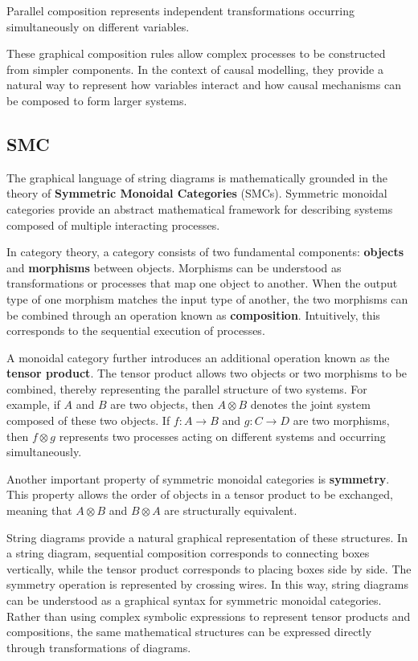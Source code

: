 \documentclass[a4paper]{report}
\begin{document}
Parallel composition represents independent transformations occurring simultaneously on different variables.

These graphical composition rules allow complex processes to be constructed from simpler components. In the context of causal modelling, they provide a natural way to represent how variables interact and how causal mechanisms can be composed to form larger systems.

\subsection{SMC}

The graphical language of string diagrams is mathematically grounded in the theory of \textbf{Symmetric Monoidal Categories} (SMCs)\cite{Selinger2011}. Symmetric monoidal categories provide an abstract mathematical framework for describing systems composed of multiple interacting processes.

In category theory, a category consists of two fundamental components: \textbf{objects} and \textbf{morphisms} between objects\cite{basic-cat-theory}. Morphisms can be understood as transformations or processes that map one object to another. When the output type of one morphism matches the input type of another, the two morphisms can be combined through an operation known as \textbf{composition}. 
Intuitively, this corresponds to the sequential execution of processes.

A monoidal category further introduces an additional operation known as the \textbf{tensor product}. The tensor product allows two objects or two morphisms to be combined, thereby representing the parallel structure of two systems. For example, if $A$ and $B$ are two objects, then $A \otimes B$ denotes the joint system composed of these two objects. If $f : A \rightarrow B$ and $g : C \rightarrow D$ are two morphisms, then $f \otimes g$ represents two processes acting on different systems and occurring simultaneously.

Another important property of symmetric monoidal categories is \textbf{symmetry}. This property allows the order of objects in a tensor product to be exchanged, meaning that $A \otimes B$ and $B \otimes A$ are structurally equivalent. 

String diagrams provide a natural graphical representation of these structures. In a string diagram, sequential composition corresponds to connecting boxes vertically, while the tensor product corresponds to placing boxes side by side. The symmetry operation is represented by crossing wires. In this way, string diagrams can be understood as a graphical syntax for symmetric monoidal categories. 
Rather than using complex symbolic expressions to represent tensor products and compositions, the same mathematical structures can be expressed directly through transformations of diagrams.
\end{document}
